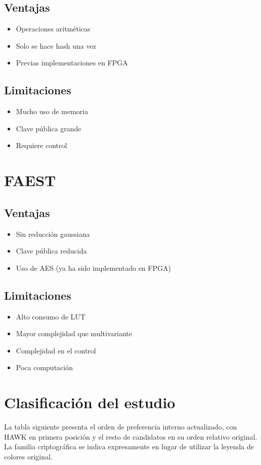 \subsection*{Ventajas}
\begin{itemize}
\item Operaciones aritméticas
\item Solo se hace hash una vez
\item Previas implementaciones en FPGA
\end{itemize}

\subsection*{Limitaciones}
\begin{itemize}
\item Mucho uso de memoria
\item Clave pública grande
\item Requiere control
\end{itemize}

\section{FAEST}

\subsection*{Ventajas}
\begin{itemize}
\item Sin reducción gaussiana
\item Clave pública reducida
\item Uso de AES (ya ha sido implementado en FPGA)
\end{itemize}

\subsection*{Limitaciones}
\begin{itemize}
\item Alto consumo de LUT
\item Mayor complejidad que multivariante
\item Complejidad en el control
\item Poca computación
\end{itemize}
\section{Clasificación del estudio}
La tabla siguiente presenta el orden de preferencia interno actualizado, con HAWK en primera posición y el resto de candidatos en su orden relativo original. La familia criptográfica se indica expresamente en lugar de utilizar la leyenda de colores original.


